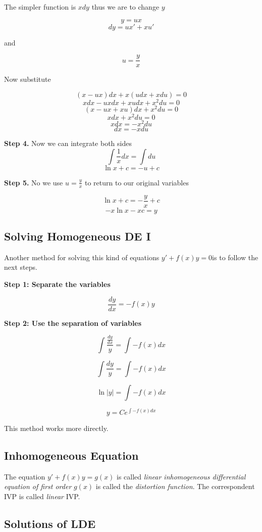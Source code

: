 The simpler function is \(xdy\) thus we are to change \(y\)

\[y = ux\]
\[dy = ux' + xu'\]

and 

\[u = \frac{y}{x}\]

Now substitute

\[(x - ux)dx + x(udx + xdu) = 0\]
\[xdx - u x dx + x u dx + x^{2}du = 0\]
\[(x - ux + xu)dx + x^{2}du = 0\]
\[xdx + x^{2}du = 0\]
\[xdx = - x^{2}du\]
\[dx = - xdu\]

\textbf{Step 4.} Now we can integrate both sides
\[\int \frac{1}{x}dx = \int du\]
\[\ln x + c = -u + c\]

\textbf{Step 5.} No we use \(u = \frac{y}{x}\) to return to our original variables

\[\ln x + c = -\frac{y}{x} + c\]
\[-x\ln x - xc = y\]


\subsection{Solving Homogeneous DE I}

Another method for solving this kind of equations \(y' + f(x)y = 0\)is to follow the next steps.
\vspace{\baselineskip}

\textbf{Step 1: Separate the variables}

\[
\frac{dy}{dx} = -f(x)y
\]

\textbf{Step 2: Use the separation of variables}

\[
\int \frac{\frac{dy}{dx}}{y} = \int -f(x) dx
\]

\[
\int \frac{dy}{y} = \int -f(x) dx
\]

\[
    \ln|y| = \int -f(x) dx
\]

\[
    y = C e^{\int -f(x) dx}
\]

This method works more directly.

\subsection{Inhomogeneous Equation}

The equation \(y' + f(x)y = g(x)\) is called \emph{linear inhomogeneous differential equation of first order}
 \(g(x)\) is called the \emph{distortion function}. The correspondent IVP is called
\emph{linear} IVP\@.

\subsection{Solutions of LDE}

